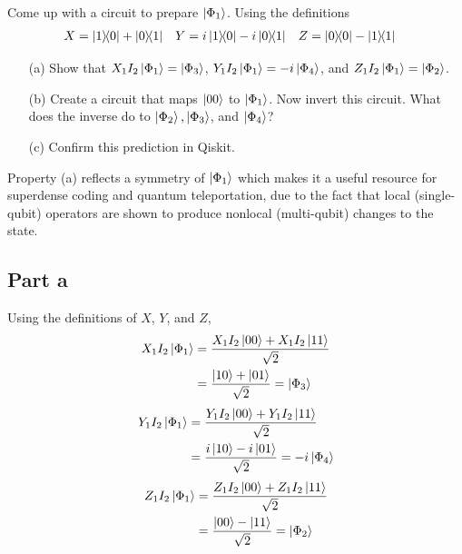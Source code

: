 \documentclass{article}
\begin{document}
{Come up with a circuit to prepare $\ket{\Phi_1}$. Using the definitions
\begin{align*}
X &= \ketbra{1}{0} + \ketbra{0}{1} & Y &= i\ketbra{1}{0} -i\ketbra{0}{1} & Z &= \ketbra{0}{0} - \ketbra{1}{1}
\end{align*}
\begin{itemize}
    \item[(a)] Show that $X_1I_2\ket{\Phi_1} = \ket{\Phi_3}$, $Y_1I_2\ket{\Phi_1} = -i\ket{\Phi_4}$, and $Z_1I_2\ket{\Phi_1} = \ket{\Phi_2}$.
    \item[(b)] Create a circuit that maps $\ket{00}$ to $\ket{\Phi_1}$. Now invert this circuit. What does the inverse do to $\ket{\Phi_2}, \ket{\Phi_3}$, and $\ket{\Phi_4}$?
    \item[(c)] Confirm this prediction in Qiskit.
\end{itemize}
Property (a) reflects a symmetry of $\ket{\Phi_1}$ which makes it a useful resource for superdense coding and quantum teleportation, due to the fact that local (single-qubit) operators are shown to produce nonlocal (multi-qubit) changes to the state.

\subsection*{Part a}
Using the definitions of $X$, $Y$, and $Z$, 
\begin{align*}
    X_1I_2 \ket{\Phi_1} &= \frac{X_1I_2 \ket{00}+X_1I_2 \ket{11}}{\sqrt{2}} \\
    &= \frac{\ket{10}+\ket{01}}{\sqrt{2}} = \ket{\Phi_3}
\end{align*}
\begin{align*}
    Y_1I_2 \ket{\Phi_1} &= \frac{Y_1I_2 \ket{00}+Y_1I_2 \ket{11}}{\sqrt{2}} \\
    &= \frac{i\ket{10}-i\ket{01}}{\sqrt{2}} = -i\ket{\Phi_4}
\end{align*}
\begin{align*}
    Z_1I_2 \ket{\Phi_1} &= \frac{Z_1I_2 \ket{00}+Z_1I_2 \ket{11}}{\sqrt{2}} \\
    &= \frac{\ket{00}-\ket{11}}{\sqrt{2}} = \ket{\Phi_2}
\end{align*}

}
\end{document}
